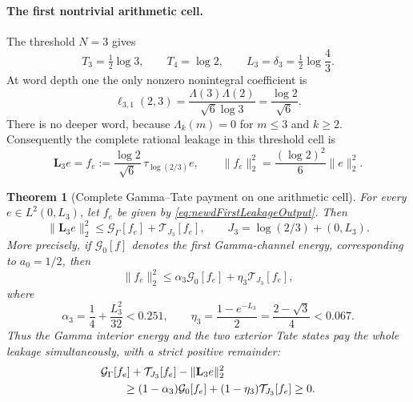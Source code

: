 \documentclass[11pt]{amsart}
\newtheorem{theorem}{Theorem}[section]
\theoremstyle{definition}
\theoremstyle{remark}
\begin{document}
\paragraph{The first nontrivial arithmetic cell.}
The threshold $N=3$ gives
\begin{equation}\label{eq:newdFirstCellLength}
 T_3=\tfrac12\log3,
 \qquad T_4=\log2,
 \qquad L_3=\delta_3=\tfrac12\log\frac43.
\end{equation}
At word depth one the only nonzero nonintegral coefficient is
\begin{equation}\label{eq:newdFirstLeakageCoefficient}
 \ell_{3,1}(2,3)
 =\frac{\Lambda(3)\Lambda(2)}{\sqrt6\log3}
 =\frac{\log2}{\sqrt6}.
\end{equation}
There is no deeper word, because $\Lambda_k(m)=0$ for $m\leq3$ and
$k\geq2$.  Consequently the complete rational leakage in this threshold
cell is
\begin{equation}\label{eq:newdFirstLeakageOutput}
 \mathbf L_3e=f_e
 :=\frac{\log2}{\sqrt6}\,
   \tau_{\log(2/3)}e,
 \qquad
 \|f_e\|_2^2=\frac{(\log2)^2}{6}\|e\|_2^2.
\end{equation}

\begin{theorem}[Complete Gamma--Tate payment on one arithmetic cell]
\label{thm:newdFirstCellPayment}
For every $e\in L^2(0,L_3)$, let $f_e$ be given by
\eqref{eq:newdFirstLeakageOutput}.  Then
\begin{equation}\label{eq:newdFirstCellPayment}
 \|\mathbf L_3e\|_2^2
 \leq \mathcal G_\Gamma[f_e]+\mathcal T_{J_3}[f_e],
 \qquad
 J_3=\log(2/3)+(0,L_3).
\end{equation}
More precisely, if $\mathcal G_{0}[f]$ denotes the first Gamma-channel
energy, corresponding to $a_0=1/2$, then
\begin{equation}\label{eq:newdFirstCellStrictPayment}
 \|f_e\|_2^2
 \leq \alpha_3\mathcal G_0[f_e]
       +\eta_3\mathcal T_{J_3}[f_e],
\end{equation}
where
\begin{equation}\label{eq:newdFirstCellConstants}
 \alpha_3=\frac14+\frac{L_3^2}{32}<0.251,
 \qquad
 \eta_3=\frac{1-e^{-L_3}}2
       =\frac{2-\sqrt3}{4}<0.067.
\end{equation}
Thus the Gamma interior energy and the two exterior Tate states pay the
whole leakage simultaneously, with a strict positive remainder:
\begin{align}
 &\mathcal G_\Gamma[f_e]+\mathcal T_{J_3}[f_e]
       -\|\mathbf L_3e\|_2^2                              \notag\\
 &\qquad\geq
 (1-\alpha_3)\mathcal G_0[f_e]
 +(1-\eta_3)\mathcal T_{J_3}[f_e]\geq0.
 \label{eq:newdFirstCellRemainder}
\end{align}
\end{theorem}
\end{document}
